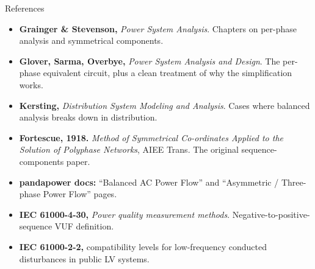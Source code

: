 \documentclass[aspectratio=169,10pt]{beamer}
\begin{document}
\begin{frame}{References}
\footnotesize
\begin{itemize}
  \item \textbf{Grainger \& Stevenson,} \emph{Power System Analysis}. Chapters on per-phase analysis and symmetrical components.
  \item \textbf{Glover, Sarma, Overbye,} \emph{Power System Analysis and Design}. The per-phase equivalent circuit, plus a clean treatment of why the simplification works.
  \item \textbf{Kersting,} \emph{Distribution System Modeling and Analysis}. Cases where balanced analysis breaks down in distribution.
  \item \textbf{Fortescue, 1918.} \emph{Method of Symmetrical Co-ordinates Applied to the Solution of Polyphase Networks}, AIEE Trans. The original sequence-components paper.
  \item \textbf{pandapower docs:} ``Balanced AC Power Flow'' and ``Asymmetric / Three-phase Power Flow'' pages.
  \item \textbf{IEC 61000-4-30,} \emph{Power quality measurement methods}. Negative-to-positive-sequence VUF definition.
  \item \textbf{IEC 61000-2-2,} compatibility levels for low-frequency conducted disturbances in public LV systems.
\end{itemize}
\end{frame}
\end{document}
